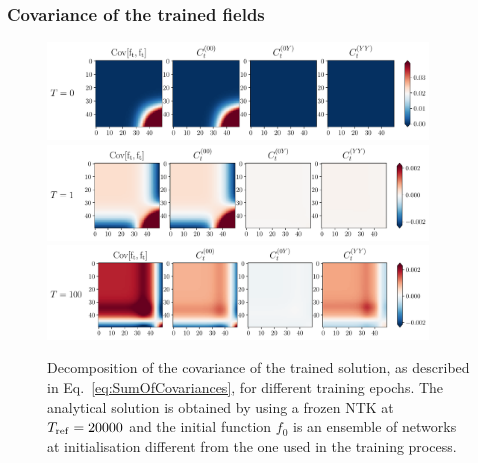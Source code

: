 \subsubsection{Covariance of the trained fields}
\label{sec:Covariance}
  \begin{figure}[ht!]
    \centering
    \includegraphics[width=0.90\textwidth]{plots/analytical_solution/covariance_ft_0_L0.pdf}
    \includegraphics[width=0.90\textwidth]{plots/analytical_solution/covariance_ft_1_L0.pdf}
    \includegraphics[width=0.90\textwidth]{plots/analytical_solution/covariance_ft_100_L0.pdf}
    \caption{Decomposition of the covariance of the trained solution, as
    described in Eq.~\eqref{eq:SumOfCovariances}, for different training epochs.
    The analytical solution is obtained by using a frozen NTK at
    $T_{\rm{ref}}=20000$ and the initial function $f_0$ is an ensemble of
    networks at initialisation different from the one used in the training
    process.}
    \label{fig:analytical_covariance_L0}
  \end{figure}
